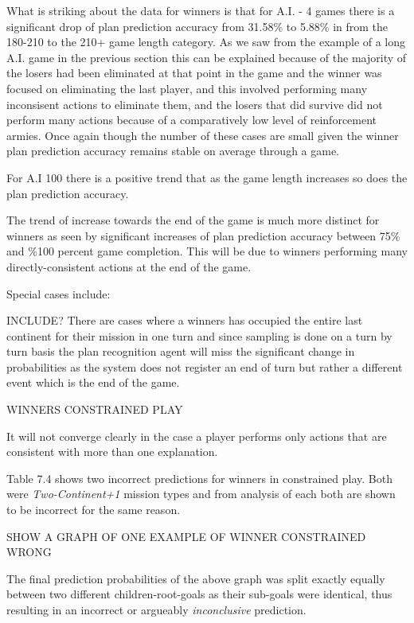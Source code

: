 \documentclass[parskip]{cs4rep}
\begin{document}
What is striking about the data for winners is that for A.I. - 4 games there is a significant drop of plan prediction accuracy from 31.58\% to 5.88\% in from the 180-210 to the 210+ game length category. As we saw from the example of a long A.I. game in the previous section this can be explained because of the majority of the losers had been eliminated at that point in the game and the winner was focused on eliminating the last player, and this involved performing many inconsisent actions to eliminate them, and the losers that did survive did not perform many actions because of a comparatively low level of reinforcement armies. Once again though the number of these cases are small given the winner plan prediction accuracy remains stable on average through a game.

For A.I 100 there is a positive trend that as the game length increases so does the plan prediction accuracy.

The trend of increase towards the end of the game is much more distinct for winners as seen by significant increases of plan prediction accuracy between 75\% and \%100 percent game completion. This will be due to winners performing many directly-consistent actions at the end of the game.

Special cases include:

INCLUDE? There are cases where a winners has occupied the entire last continent for their mission in one turn and since sampling is done on a turn by turn basis the plan recognition agent will miss the significant change in probabilities as the system does not register an end of turn but rather a different event which is the end of the game.

WINNERS CONSTRAINED PLAY

It will not converge clearly in the case a player performs only actions that are consistent with more than one explanation.

Table 7.4 shows two incorrect predictions for winners in constrained play. Both were \textit{Two-Continent+1} mission types and from analysis of each both are shown to be incorrect for the same reason. 

SHOW A GRAPH OF ONE EXAMPLE OF WINNER CONSTRAINED WRONG

The final prediction probabilities of the above graph was split exactly equally between two different children-root-goals as their sub-goals were identical, thus resulting in an incorrect or argueably \textit{inconclusive} prediction.

\newpage
\end{document}
